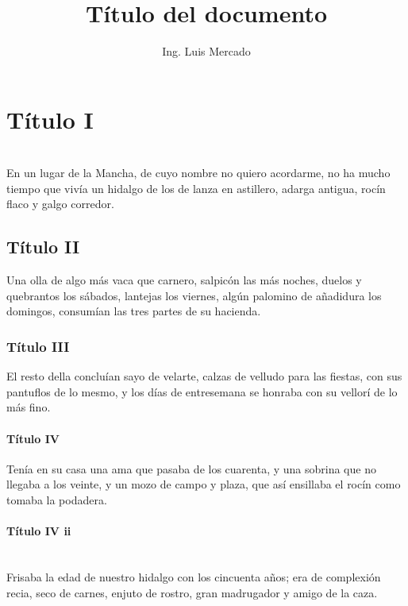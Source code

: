 \documentclass[stu, 12pt, letterpaper, donotrepeattitle, floatsintext, natbib]{apa7}
\title{\Large Título del documento}
\author{Ing. Luis Mercado} %
\newcommand{\myparagraph}[1]{\paragraph{#1}\mbox{}\\}
\begin{document}
\maketitle



\renewcommand\contentsname{\large{Índice}}
\tableofcontents
\setcounter{tocdepth}{2}
\newpage

\renewcommand{\listfigurename}{\large{Índice de fíguras}}
\listoffigures
\newpage

\renewcommand{\listtablename}{\large{Índice de tablas}}
\listoftables
\newpage


\section{\large Título I}
\noindent {}\\
En un lugar de la Mancha, de cuyo nombre no quiero acordarme,
no ha mucho tiempo que vivía un hidalgo de los de lanza en astillero,
adarga antigua, rocín flaco y galgo corredor.

\subsection{Título II}
Una olla de algo más vaca que carnero, salpicón las más noches, duelos 
y quebrantos los sábados, lantejas los viernes, algún palomino de añadidura 
los domingos, consumían las tres partes de su hacienda.

\subsubsection{Título III}
El resto della concluían sayo de velarte, calzas de velludo para las 
fiestas, con sus pantuflos de lo mesmo, y los días de entresemana 
se honraba con su vellorí de lo más fino.

\paragraph{Título IV}
Tenía en su casa una ama que pasaba de los cuarenta, y una sobrina 
que no llegaba a los veinte, y un mozo de campo y plaza, que así 
ensillaba el rocín como tomaba la podadera.

\myparagraph{Título IV ii}
Frisaba la edad de nuestro hidalgo con los cincuenta años; 
era de complexión recia, seco de carnes, enjuto de rostro, gran 
madrugador y amigo de la caza.
\end{document}
